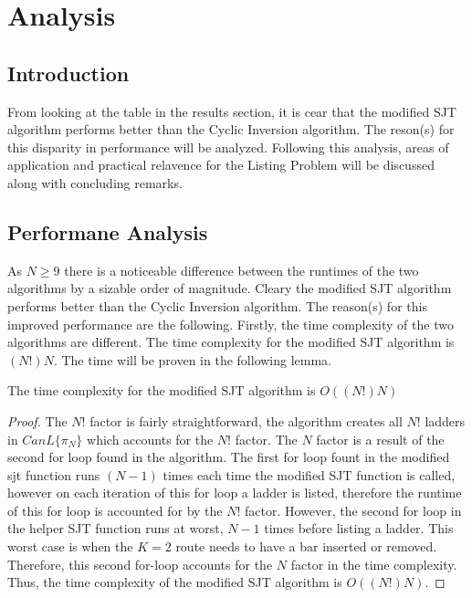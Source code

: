 
\section{Analysis}
\subsection{Introduction}
    From looking at the table in the results section, it is cear that the modified SJT algorithm performs 
    better than the Cyclic Inversion algorithm. The reson(s) for this disparity in performance 
    will be analyzed. Following this analysis, areas of application and practical relavence for the Listing Problem 
    will be discussed along with concluding remarks.

\subsection{Performane Analysis}
    As $N \geq 9$ there is a noticeable difference between the runtimes of the two algorithms by a sizable order 
    of magnitude. Cleary the modified SJT algorithm performs better than the Cyclic Inversion algorithm. The reason(s) 
    for this improved performance are the following. Firstly, the time complexity of the two algorithms are different. 
    The time complexity for the modified SJT algorithm is $(N!)N$. The time will be proven in the following lemma.
    \begin{lemma}
        The time complexity for the modified SJT algorithm is $O((N!)N)$
    \end{lemma}
    \begin{proof}
        The $N!$ factor is fairly straightforward, the algorithm creates all $N!$ ladders in $CanL\{\pi_{N}\}$ which 
        accounts for the $N!$ factor. The $N$ factor is a result of the second for loop found in the algorithm. The first for loop 
        fount in the modified sjt function runs $(N-1)$ times each time the modified SJT function is called, however on each 
        iteration of this for loop a ladder is listed, therefore the runtime of this for loop is accounted for by the $N!$ factor. However, 
        the second for loop in the helper SJT function runs at worst, $N-1$ times before listing a ladder. This worst case 
        is when the $K=2$ route needs to have a bar inserted or removed. Therefore, this second for-loop accounts for the $N$ factor 
        in the time complexity. Thus, the time complexity of the modified SJT algorithm is $O((N!)N)$.
    \end{proof}

